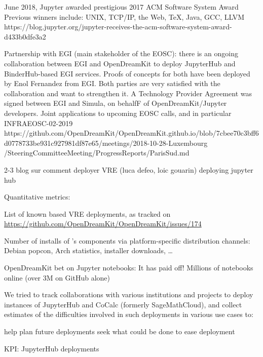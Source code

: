 \begin{Aim 1}
\begin{Aim 2}
\begin{itemize}
       June 2018, Jupyter awarded prestigious 2017 ACM Software System Award
       Previous winners include: UNIX, TCP/IP, the Web, TeX, Java, GCC, LLVM
       https://blog.jupyter.org/jupyter-receives-the-acm-software-system-award-d433b0dfe3a2
       
       
       Partnership with EGI (main stakeholder of the EOSC): there is an ongoing collaboration between EGI and OpenDreamKit to deploy
       JupyterHub and BinderHub-based EGI services. Proofs of concepts for both have been deployed by Enol Fernandez from EGI. Both parties
       are very satisfied with the collaboration and want to strengthen it. A Technology Provider Agreement was signed between EGI and
       Simula, on behalfF of OpenDreamKit/Jupyter developers. Joint applications to upcoming EOSC calls, and in particular INFRAEOSC-02-2019
       https://github.com/OpenDreamKit/OpenDreamKit.github.io/blob/7cbee70c3bff6d0778733be931c927981df87e65/meetings/2018-10-28-Luxembourg
       /SteeringCommitteeMeeting/ProgressReports/ParisSud.md
       
       
       2-3 blog sur comment deployer VRE (luca defeo, loic gouarin) deploying jupyter hub
         
  Quantitative metrics:
\begin{description}
\item List of known \ODK based VRE deployments, as tracked on \url{https://github.com/OpenDreamKit/OpenDreamKit/issues/174}
\item Number of installs of \ODK's components via platform-specific distribution channels: Debian popcon, Arch statistics, installer
  downloads, \dots
\end{description}

       OpenDreamKit bet on Jupyter notebooks: It has paid off!
       Millions of notebooks online (over 3M on GitHub alone)

We tried to track collaborations with various institutions and projects to deploy instances of JupyterHub and CoCalc (formerly SageMathCloud), and collect estimates of the difficulties involved in such deployments in various use cases to:

    help plan future deployments
    seek what could be done to ease deployment
    
    KPI: JupyterHub deployments


\end{itemize}
\end{Aim 2}
\end{Aim 1}

